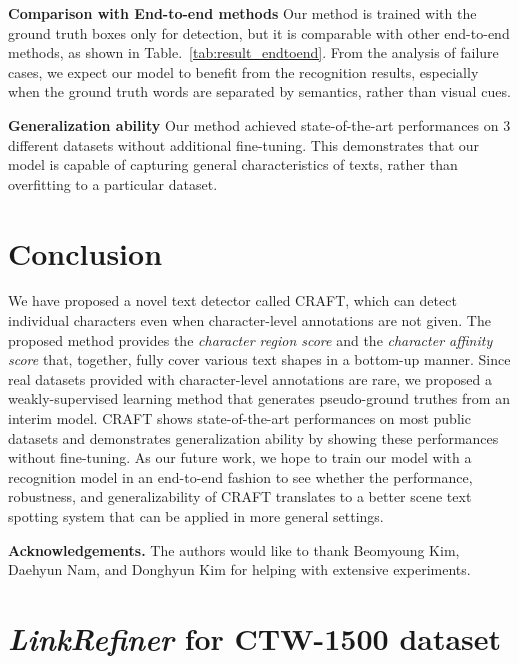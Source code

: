 \documentclass[10pt,twocolumn,letterpaper]{article}
\begin{document}
\noindent\textbf{\bf Comparison with End-to-end methods} Our method is trained with the ground truth boxes only for detection, but it is comparable with other end-to-end methods, as shown in Table.~\ref{tab:result_endtoend}. From the analysis of failure cases, we expect our model to benefit from the recognition results, especially when the ground truth words are separated by semantics, rather than visual cues.





\noindent\textbf{Generalization ability}
Our method achieved state-of-the-art performances on 3 different datasets without additional fine-tuning. This demonstrates that our model is capable of capturing general characteristics of texts, rather than overfitting to a particular dataset.



 \section{Conclusion}
We have proposed a novel text detector called CRAFT, which can detect individual characters even when character-level annotations are not given. The proposed method provides the \textit{character region score} and the \textit{character affinity score} that, together, fully cover various text shapes in a bottom-up manner. Since real datasets provided with character-level annotations are rare, we proposed a weakly-supervised learning method that generates pseudo-ground truthes from an interim model.
CRAFT shows state-of-the-art performances on most public datasets and demonstrates generalization ability by showing these performances without fine-tuning. 
As our future work, we hope to train our model with a recognition model in an end-to-end fashion to see whether the performance, robustness, and generalizability of CRAFT translates to a better scene text spotting system that can be applied in more general settings.
 

\vspace{2mm}
\noindent\textbf{Acknowledgements.} The authors would like to thank Beomyoung Kim, Daehyun Nam, and Donghyun Kim for helping with extensive experiments.

{\small


}

\clearpage
\appendix

\section{\textit{LinkRefiner} for CTW-1500 dataset}
\end{document}
